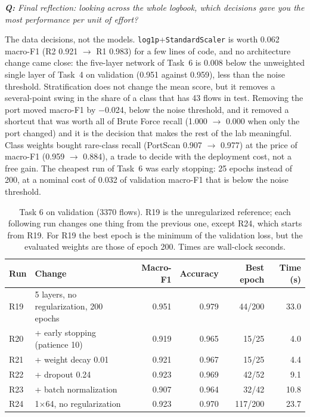 \documentclass[9pt]{extarticle}
\newcommand{\qa}[1]{\par\vspace{2pt}\noindent\textit{\textbf{Q:} #1}\par\nopagebreak\noindent}
\newcommand{\run}[1]{\textsf{#1}}   %
\begin{document}
\qa{Final reflection: looking across the whole logbook, which decisions gave you the most performance
per unit of effort?}
The data decisions, not the models. \texttt{log1p}+\texttt{StandardScaler} is worth 0.062 macro-F1
(\run{R2} 0.921 $\to$ \run{R1} 0.983) for a few lines of code, and no architecture change came
close: the five-layer network of Task~6 is 0.008 below the unweighted single layer of Task~4 on
validation (0.951 against 0.959), less than the noise threshold. Stratification does not change the
mean score, but it removes a several-point swing in the share of a class that has 43 flows in test.
Removing the port moved macro-F1 by $-$0.024, below the noise threshold, and it removed a shortcut
that was worth all of Brute Force recall (1.000 $\to$ 0.000 when only the port changed) and it is the decision that makes the rest of
the lab meaningful. Class weights bought rare-class recall (PortScan 0.907 $\to$ 0.977) at the price of
macro-F1 (0.959 $\to$ 0.884), a trade to decide with the deployment cost, not a free gain. The cheapest
run of Task~6 was early stopping: 25 epochs instead of 200, at a nominal cost of 0.032 of validation
macro-F1 that is below the noise threshold.

\begin{table}[htbp]
\centering\small
\caption{Task 6 on validation (3370 flows). \run{R19} is the unregularized reference; each following
run changes one thing from the previous one, except \run{R24}, which starts from \run{R19}. For
\run{R19} the best epoch is the minimum of the validation loss, but the evaluated weights are those of
epoch 200. Times are wall-clock seconds.}
\label{tab:t6}
\begin{tabular}{@{}llrrrr@{}}
\toprule
Run & Change & Macro-F1 & Accuracy & Best epoch & Time (s)\\
\midrule
\run{R19} & 5 layers, no regularization, 200 epochs & 0.951 & 0.979 &  44/200 &  33.0\\
\run{R20} & + early stopping (patience 10)          & 0.919 & 0.965 &  15/25  &   4.0\\
\run{R21} & + weight decay 0.01                     & 0.921 & 0.967 &  15/25  &   4.4\\
\run{R22} & + dropout 0.24                          & 0.923 & 0.969 &  42/52  &   9.1\\
\run{R23} & + batch normalization                   & 0.907 & 0.964 &  32/42  &  10.8\\
\run{R24} & 1$\times$64, no regularization          & 0.923 & 0.970 & 117/200 &  23.7\\
\bottomrule
\end{tabular}
\end{table}
\end{document}
